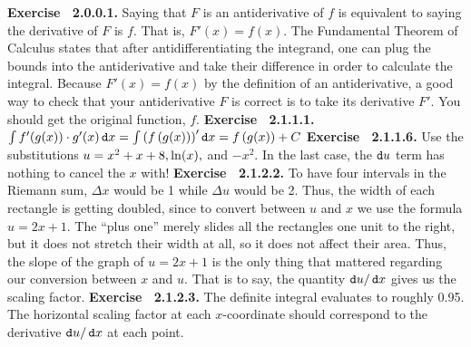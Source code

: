 \par 
 {\noindent \protect \bf  Exercise ~2.0.0.1.} Saying that $F$ is an antiderivative of $f$ is equivalent to saying the derivative of $F$ is $f$. That is, $F'(x)=f(x)$. The Fundamental Theorem of Calculus states that after antidifferentiating the integrand, one can plug the bounds into the antiderivative and take their difference in order to calculate the integral. Because $F'(x)=f(x)$ by the definition of an antiderivative, a good way to check that your antiderivative $F$ is correct is to take its derivative $F'$. You should get the original function, $f$. \protect \newline  \protect \newline  
 {\noindent \protect \bf  Exercise ~2.1.1.1.} $ \intop f'(g(x)) \cdot g'(x) \mathop {}\protect \tmspace  -\thinmuskip {.1667em}\protect \mathtt  {d}x = \intop \left (f\left (g(x)\right )\right )' \mathop {}\protect \tmspace  -\thinmuskip {.1667em}\protect \mathtt  {d}x= f\left (g(x)\right )+C$ \protect \newline  \protect \newline  
 {\noindent \protect \bf  Exercise ~2.1.1.6.} Use the substitutions $u=x^2+x+8, \protect \qopname  \relax o{ln}(x),$ and $-x^2$. In the last case, the $\mathop {}\protect \tmspace  -\thinmuskip {.1667em}\protect \mathtt  {d}u$ term has nothing to cancel the $x$ with! \protect \newline  \protect \newline  
 {\noindent \protect \bf  Exercise ~2.1.2.2.} To have four intervals in the Riemann sum, $\Delta x$ would be 1 while $\Delta u$ would be 2. Thus, the width of each rectangle is getting doubled, since to convert between $u$ and $x$ we use the formula $u=2x+1$. The ``plus one'' merely slides all the rectangles one unit to the right, but it does not stretch their width at all, so it does not affect their area. Thus, the slope of the graph of $u=2x+1$ is the only thing that mattered regarding our conversion between $x$ and $u$. That is to say, the quantity $\mathop {}\protect \tmspace  -\thinmuskip {.1667em}\protect \mathtt  {d}u/ \mathop {}\protect \tmspace  -\thinmuskip {.1667em}\protect \mathtt  {d}x$ gives us the scaling factor. \protect \newline  \protect \newline  
 {\noindent \protect \bf  Exercise ~2.1.2.3.} The definite integral evaluates to roughly 0.95. The horizontal scaling factor at each $x$-coordinate should correspond to the derivative $\mathop {}\protect \tmspace  -\thinmuskip {.1667em}\protect \mathtt  {d}u /\mathop {}\protect \tmspace  -\thinmuskip {.1667em}\protect \mathtt  {d}x$ at each point.  \protect \newline  \protect \newline  

